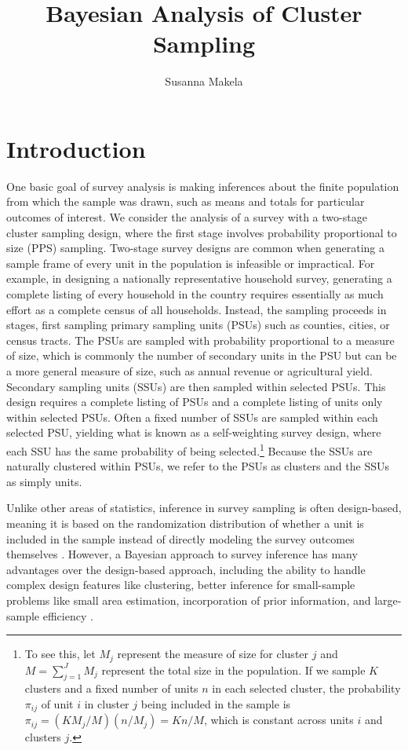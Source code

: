 \documentclass[12pt,a4paper]{article}
\author{Susanna Makela}
\title{Bayesian Analysis of Cluster Sampling}
\begin{document}
\maketitle
\singlespacing

\section*{Introduction}
One basic goal of survey analysis is making inferences about the finite population from which the sample was drawn, such as means and totals for particular outcomes of interest. We consider the analysis of a survey with a two-stage cluster sampling design, where the first stage involves probability proportional to size (PPS) sampling. Two-stage survey designs are common when generating a sample frame of every unit in the population is infeasible or impractical. For example, in designing a nationally representative household survey, generating a complete listing of every household in the country requires essentially as much effort as a complete census of all households. Instead, the sampling proceeds in stages, first sampling primary sampling units (PSUs) such as counties, cities, or census tracts. The PSUs are sampled with probability proportional to a measure of size, which is commonly the number of secondary units in the PSU but can be a more general measure of size, such as annual revenue or agricultural yield. Secondary sampling units (SSUs) are then sampled within selected PSUs. This design requires a complete listing of PSUs and a complete listing of units only within selected PSUs. Often a fixed number of SSUs are sampled within each selected PSU, yielding what is known as a self-weighting survey design, where each SSU has the same probability of being selected.\footnote{To see this, let $M_j$ represent the measure of size for cluster $j$ and $M=\sum_{j=1}^J M_j$ represent the total size in the population. If we sample $K$ clusters and a fixed number of units $n$ in each selected cluster, the probability $\pi_{ij}$ of unit $i$ in cluster $j$ being included in the sample is $\pi_{ij} = (KM_j/M)(n/M_j) = Kn/M$, which is constant across units $i$ and clusters $j$.} Because the SSUs are naturally clustered within PSUs, we refer to the PSUs as clusters and the SSUs as simply units.

Unlike other areas of statistics, inference in survey sampling is often design-based, meaning it is based on the randomization distribution of whether a unit is included in the sample instead of directly modeling the survey outcomes themselves \citep{little2004}. However, a Bayesian approach to survey inference has many advantages over the design-based approach, including the ability to handle complex design features like clustering, better inference for small-sample problems like small area estimation, incorporation of prior information, and large-sample efficiency \citep{little2004}.
\end{document}
